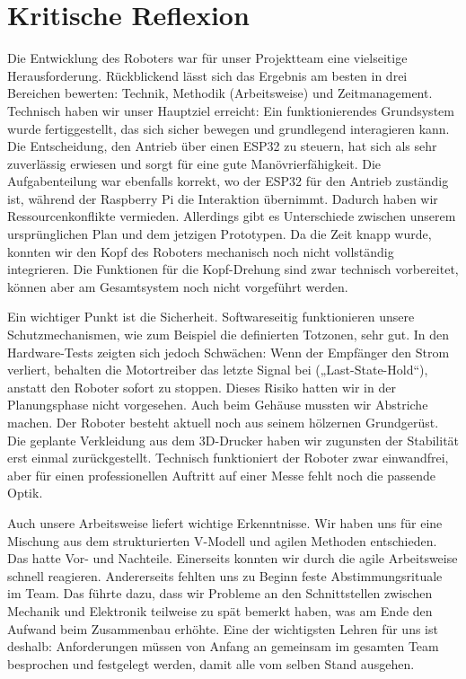 \section{Kritische Reflexion}
\label{cha:Kritische Reflexion}

Die Entwicklung des Roboters war für unser Projektteam eine vielseitige Herausforderung. Rückblickend lässt sich das Ergebnis am besten in drei Bereichen bewerten: Technik, Methodik (Arbeitsweise) und Zeitmanagement. Technisch haben wir unser Hauptziel erreicht: Ein funktionierendes Grundsystem wurde fertiggestellt, das sich sicher bewegen und grundlegend interagieren kann. Die Entscheidung, den Antrieb über einen ESP32 zu steuern, hat sich als sehr zuverlässig erwiesen und sorgt für eine gute Manövrierfähigkeit. Die Aufgabenteilung war ebenfalls korrekt, wo der ESP32 für den Antrieb zuständig ist, während der Raspberry Pi die Interaktion übernimmt. Dadurch haben wir Ressourcenkonflikte vermieden. Allerdings gibt es Unterschiede zwischen unserem ursprünglichen Plan und dem jetzigen Prototypen. Da die Zeit knapp wurde, konnten wir den Kopf des Roboters mechanisch noch nicht vollständig integrieren. Die Funktionen für die Kopf-Drehung sind zwar technisch vorbereitet, können aber am Gesamtsystem noch nicht vorgeführt werden.

Ein wichtiger Punkt ist die Sicherheit. Softwareseitig funktionieren unsere Schutzmechanismen, wie zum Beispiel die definierten Totzonen, sehr gut. In den Hardware-Tests zeigten sich jedoch Schwächen: Wenn der Empfänger den Strom verliert, behalten die Motortreiber das letzte Signal bei („Last-State-Hold“), anstatt den Roboter sofort zu stoppen. Dieses Risiko hatten wir in der Planungsphase nicht vorgesehen. Auch beim Gehäuse mussten wir Abstriche machen. Der Roboter besteht aktuell noch aus seinem hölzernen Grundgerüst. Die geplante Verkleidung aus dem 3D-Drucker haben wir zugunsten der Stabilität erst einmal zurückgestellt. Technisch funktioniert der Roboter zwar einwandfrei, aber für einen professionellen Auftritt auf einer Messe fehlt noch die passende Optik.

Auch unsere Arbeitsweise liefert wichtige Erkenntnisse. Wir haben uns für eine Mischung aus dem strukturierten V-Modell und agilen Methoden entschieden. Das hatte Vor- und Nachteile. Einerseits konnten wir durch die agile Arbeitsweise schnell reagieren. Andererseits fehlten uns zu Beginn feste Abstimmungsrituale im Team. Das führte dazu, dass wir Probleme an den Schnittstellen zwischen Mechanik und Elektronik teilweise zu spät bemerkt haben, was am Ende den Aufwand beim Zusammenbau erhöhte. Eine der wichtigsten Lehren für uns ist deshalb: Anforderungen müssen von Anfang an gemeinsam im gesamten Team besprochen und festgelegt werden, damit alle vom selben Stand ausgehen.

